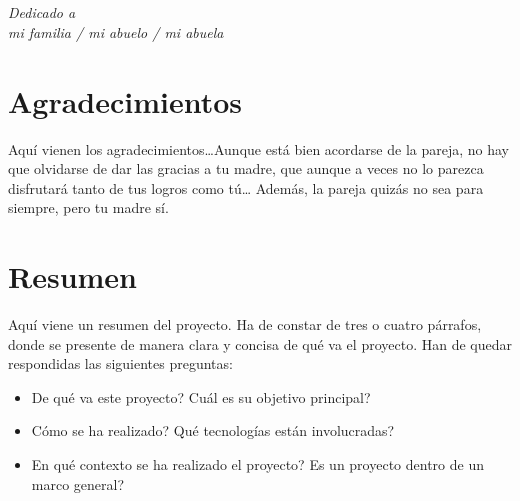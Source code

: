 \documentclass[a4paper, 12pt]{report}
\begin{document}
\newpage
\mbox{}
\thispagestyle{empty} %




\chapter*{}
\begin{flushright}
\textit{Dedicado a \\
mi familia / mi abuelo / mi abuela}
\end{flushright}


\chapter*{Agradecimientos}

Aquí vienen los agradecimientos\ldots Aunque está bien acordarse de la pareja, no hay que olvidarse de dar las gracias a tu madre, que aunque a veces no lo parezca disfrutará tanto de tus logros como tú\ldots 
Además, la pareja quizás no sea para siempre, pero tu madre sí.


\chapter*{Resumen}

Aquí viene un resumen del proyecto. Ha de constar de tres o cuatro párrafos, donde se presente de manera clara y concisa de qué va el proyecto. 
Han de quedar respondidas las siguientes preguntas:

\begin{itemize}
  \item De qué va este proyecto? Cuál es su objetivo principal?
  \item Cómo se ha realizado? Qué tecnologías están involucradas?
  \item En qué contexto se ha realizado el proyecto? Es un proyecto
dentro de un marco general?
\end{itemize}
\end{document}
